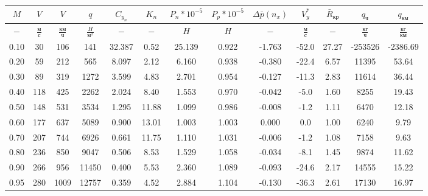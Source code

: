 \begin{tabular}{|c|c|c|c|c|c|c|c|c|c|c|c|c|}
\hline
$M$ & $V$ & $V$ & $q$ & $C_{y_n}$ & $K_n$ & $P_n*10^{-5}$ & $P_p*10^{-5}$ & $\Delta \bar{p}(n_x)$ & $V_y^*$ & $\bar{R}_{кр}$ & $q_{ч}$ & $q_{км}$ \\ 
\hline
$-$ & $\frac{м}{с}$ & $\frac{км}{ч}$ & $\frac{H}{м^2}$ & $-$ & $-$ & $H$ & $H$ & $-$ & $\frac{м}{с}$ & $-$ & $\frac{кг}{ч}$ & $\frac{кг}{км}$ \\ 
\hline
0.10 & 30 & 106 & 141 & 32.387 & 0.52 & 25.139 & 0.922 & -1.763 & -52.0 & 27.27 & -253526 & -2386.69 \\ 
\hline
0.20 & 59 & 212 & 565 & 8.097 & 2.12 & 6.160 & 0.938 & -0.380 & -22.4 & 6.57 & 11395 & 53.64 \\ 
\hline
0.30 & 89 & 319 & 1272 & 3.599 & 4.83 & 2.701 & 0.954 & -0.127 & -11.3 & 2.83 & 11614 & 36.44 \\ 
\hline
0.40 & 118 & 425 & 2262 & 2.024 & 8.40 & 1.553 & 0.970 & -0.042 & -5.0 & 1.60 & 8255 & 19.43 \\ 
\hline
0.50 & 148 & 531 & 3534 & 1.295 & 11.88 & 1.099 & 0.986 & -0.008 & -1.2 & 1.11 & 6470 & 12.18 \\ 
\hline
0.60 & 177 & 637 & 5089 & 0.900 & 13.01 & 1.003 & 1.003 & 0.000 & 0.0 & 1.00 & 6240 & 9.79 \\ 
\hline
0.70 & 207 & 744 & 6926 & 0.661 & 11.75 & 1.110 & 1.031 & -0.006 & -1.2 & 1.08 & 7158 & 9.63 \\ 
\hline
0.80 & 236 & 850 & 9047 & 0.506 & 8.53 & 1.529 & 1.058 & -0.034 & -8.1 & 1.45 & 9874 & 11.62 \\ 
\hline
0.90 & 266 & 956 & 11450 & 0.400 & 5.53 & 2.360 & 1.089 & -0.093 & -24.6 & 2.17 & 14555 & 15.22 \\ 
\hline
0.95 & 280 & 1009 & 12757 & 0.359 & 4.52 & 2.884 & 1.104 & -0.130 & -36.3 & 2.61 & 17130 & 16.97 \\ 
\hline
\end{tabular}